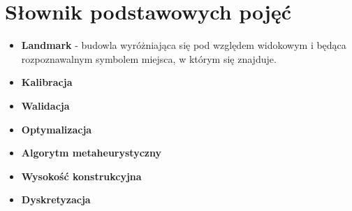 \chapter*{Słownik podstawowych pojęć}
\begin{itemize}[label = {},leftmargin=*]
\item \textbf{Landmark} - budowla wyróżniająca się pod względem widokowym i będąca rozpoznawalnym symbolem miejsca, w którym się znajduje.
\item \textbf{Kalibracja}
\item \textbf{Walidacja}
\item \textbf{Optymalizacja}
\item \textbf{Algorytm metaheurystyczny}
\item \textbf{Wysokość konstrukcyjna}
\item \textbf{Dyskretyzacja}
\end{itemize}